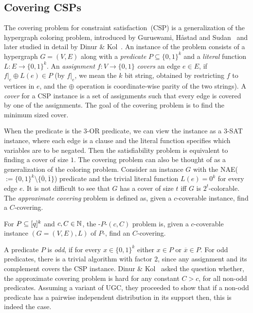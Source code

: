 \subsection{Covering CSPs}
\label{sec:intro-cover}
The covering problem for constraint satisfaction~(CSP) is a generalization of the hypergraph
coloring problem, introduced by
Guruswami, H\aa stad and Sudan~\cite{GuruswamiHS2002} and later studied in 
detail by Dinur \& Kol~\cite{DinurK2013}. An instance of the problem
consists of a hypergraph $G=(V,E)$ along with a \emph{predicate} $P
\subseteq \{0,1\}^k$ and a \emph{literal} function $L:E\rightarrow
\{0,1\}^k$. An \emph{assignment} $f:V \rightarrow \{0,1\}$
\emph{covers} an edge $e\in E$, if $f|_e \oplus L(e) \in P$ (by $f|_e$,
we mean the $k$ bit string, obtained by restricting $f$ to vertices in $e$, and the 
$\oplus$ operation is coordinate-wise parity of the two strings). 
A \emph{cover} for a CSP instance is a set of 
assignments such that every edge is covered by one of the assignments.
 The goal of the covering problem is to find the minimum sized cover.
 
 When the predicate is the $3$-OR predicate, we can view the
 instance as a $3$-SAT instance, where each edge is a clause and the literal function
 specifies which variables are to be negated.
 Then the satisfiability problem is equivalent to finding a cover of size $1$.
The covering problem can also be thought of as a generalization of the coloring
problem. Consider an instance $G$  with the NAE(
$:=\{0,1\}^k \setminus \{ \overline 0, \overline 1\}$) predicate 
and the trivial literal function $L(e) = 0^k$ for every edge $e$.
It is not difficult to see that $G$ has a cover of size $t$
 iff $G$ is $2^t$-colorable. The \emph{approximate covering} problem is defined as,
given a $c$-coverable instance, find a $C$-covering.\\
\begin{definition}
  
	\label{def:cov-csp}
	For $P \subseteq [q]^k$ and $c,C \in \mathbb N$, the \cov-$P$-\csp$(c,C)$ problem is, 
	given a $c$-coverable instance  $(G=(V,E),L)$ of $P$-\csp, find an 
	$C$-covering.
\end{definition}

A predicate $P$ is \emph{odd}, if for every $x \in \{0,1\}^k$ either $x \in
P$ or $\overline{x} \in P$. For odd predicates,
there is a trivial algorithm with factor $2$, since any assignment
and its complement covers the CSP instance. Dinur \& Kol~\cite{DinurK2013} asked the question
whether,  the approximate covering problem is hard for any constant $C>c$, for all non-odd
predicates. Assuming a variant of UGC, they proceeded to show that if a non-odd predicate has a
pairwise independent distribution in its support then, this is indeed
the case.


